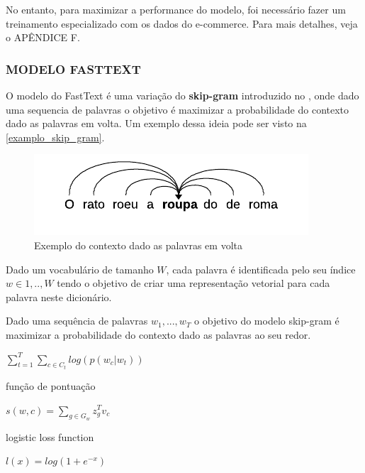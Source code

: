 No entanto, para maximizar a performance do modelo, foi necessário fazer um treinamento especializado com os dados do e-commerce. Para mais detalhes, veja o APÊNDICE F.

\subsubsection{MODELO FASTTEXT}

O modelo do FastText é uma variação do \textbf{skip-gram} introduzido no \cite{mikolov}, onde dado uma sequencia de palavras o objetivo é maximizar a probabilidade do contexto dado as palavras em volta. Um exemplo dessa ideia pode ser visto na \autoref{examplo_skip_gram}.

\begin{figure}[htb]
	\caption{\label{examplo_skip_gram} Exemplo do contexto dado as palavras em volta}
	\begin{center}
	    \includegraphics[scale=1.0]{artigo/recursos/imagens/examplo_skip_gram.png}
	\end{center}
\end{figure}

Dado um vocabulário de tamanho $W$, cada palavra é identificada pelo seu índice $w \in {1, .., W}$ tendo o objetivo de criar uma representação vetorial para cada palavra neste dicionário.

Dado uma sequência de palavras $w_1, ..., w_T$ o objetivo do modelo skip-gram é maximizar a probabilidade do contexto dado as palavras ao seu redor.

\begin{center}\large
    $\sum_{t=1}^{T} \sum_{c \in C_t} log(p(w_c | w_t))$
\end{center}

função de pontuação

\begin{center}\large
    $s(w, c) = \sum_{g \in G_w} z_{g}^{T} v_c$
\end{center}

logistic loss function

\begin{center}\large
    $l(x) = log(1 + e^{-x})$
\end{center}

